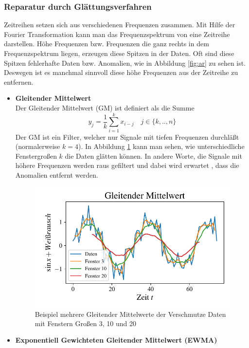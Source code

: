 \subsubsection{Reparatur durch Glättungsverfahren}
Zeitreihen setzen sich aus verschiedenen Frequenzen zusammen. Mit Hilfe der
Fourier Transformation kann man das Frequenzspektrum von eine Zeitreihe
darstellen. Höhe Frequenzen bzw. Frequenzen die ganz rechts in dem
Frequenzspektrum liegen, erzeugen diese Spitzen in der Daten. Oft sind diese
Spitzen fehlerhafte Daten bzw. Anomalien, wie in Abbildung \ref{fig:ar} zu
sehen ist. Deswegen ist es manchmal sinnvoll diese höhe Frequenzen aus der
Zeitreihe zu entfernen.
\begin{itemize}
  \item \textbf{Gleitender Mittelwert}\\
Der Gleitender Mittelwert (GM) ist definiert als die Summe 
\[
    y_j = \frac{1}{k}\sum_{i=1}^{k}x_{i-j} \quad j \in \{k,..,n\}
\] 
Der GM ist ein Filter, welcher nur Signale mit tiefen Frequenzen durchläßt
(normalerweise $k=4$). In Abbildung \ref{fig:rolling} kann man sehen, wie
unterschiedliche Fenstergroßen $k$ die Daten glätten können. In andere Worte,
die Signale mit höhere Frequenzen werden raus gefiltert und dabei wird erwartet
, dass die Anomalien entfernt werden.
\begin{figure}[h]
      \centering
      \includegraphics[width=\textwidth,keepaspectratio]{../plots/Gleitender_Mittelwert.pdf}
      \caption{Beispiel mehrere Gleitender Mittelwerte der 
      Verschmutze Daten mit Fenstern Großen 3, 10 und 20}
      \label{fig:rolling}
\end{figure}
  \item  \textbf{Exponentiell Gewichteten Gleitender Mittelwert (EWMA)}\\

\end{itemize}
